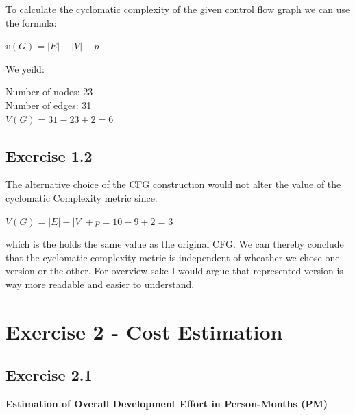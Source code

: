 \documentclass[a4paper]{scrartcl}
\begin{document}
To calculate the cyclomatic complexity of the given control flow graph we can use the formula:
\begin{center}
  $v(G) = |E| - |V| + p$
\end{center}

We yeild:
\begin{center}
  Number of nodes: 23 \\
  Number of edges: 31 \\
  $V(G) = 31 - 23 + 2 = 6$
\end{center}

\subsection*{Exercise 1.2}
The alternative choice of the CFG construction would not alter the value of the cyclomatic Complexity metric since:
\begin{center}
  $V(G) = |E| - |V| + p = 10 - 9 + 2 = 3$
\end{center}
which is the holds the same value as the original CFG. We can thereby conclude that the cyclomatic complexity metric 
is independent of wheather we chose one version or the other. For overview sake I would argue that represented version 
is way more readable and easier to understand.

\section*{Exercise 2 - Cost Estimation}
\subsection*{Exercise 2.1}
\textbf{Estimation of Overall Development Effort in Person-Months (PM)}
\end{document}
